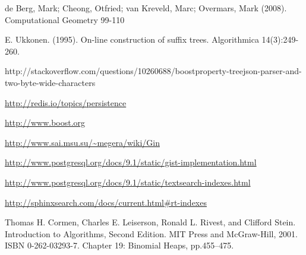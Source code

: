 \documentclass[10pt,a4paper]{article}
\begin{document}
\begin{thebibliography}{99}

 de Berg, Mark; Cheong, Otfried; van Kreveld, Marc; Overmars, Mark (2008). Computational Geometry 99-110

 E. Ukkonen. (1995). On-line construction of suffix trees. Algorithmica 14(3):249-260.

 http://stackoverflow.com/questions/10260688/boostproperty-treejson-parser-and-two-byte-wide-characters

 \url{http://redis.io/topics/persistence}

 \url{http://www.boost.org}

 \url{http://www.sai.msu.su/~megera/wiki/Gin}

 \url{http://www.postgresql.org/docs/9.1/static/gist-implementation.html}

 \url{http://www.postgresql.org/docs/9.1/static/textsearch-indexes.html}

 \url{http://sphinxsearch.com/docs/current.html#rt-indexes}

Thomas H. Cormen, Charles E. Leiserson, Ronald L. Rivest, and Clifford Stein. Introduction to Algorithms, Second Edition. MIT Press and McGraw-Hill, 2001. ISBN 0-262-03293-7. Chapter 19: Binomial Heaps, pp.455–475.

\end{thebibliography}\
\end{document}
